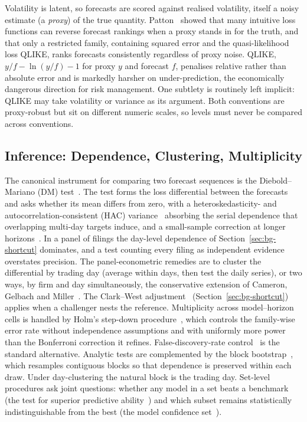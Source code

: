 Volatility is latent, so forecasts are scored against realised volatility, itself a noisy estimate (a \emph{proxy}) of the true quantity. Patton~\cite{patton2011proxies} showed that many intuitive loss functions can reverse forecast rankings when a proxy stands in for the truth, and that only a restricted family, containing squared error and the quasi-likelihood loss QLIKE, ranks forecasts consistently regardless of proxy noise. QLIKE, $y/f - \ln(y/f) - 1$ for proxy $y$ and forecast $f$, penalises relative rather than absolute error and is markedly harsher on under-prediction, the economically dangerous direction for risk management. One subtlety is routinely left implicit: QLIKE may take volatility or variance as its argument. Both conventions are proxy-robust but sit on different numeric scales, so levels must never be compared across conventions.

\subsection{Inference: Dependence, Clustering, Multiplicity}
\label{sec:bg-methods-inference}

The canonical instrument for comparing two forecast sequences is the Diebold--Mariano (DM) test~\cite{diebold1995comparing}. The test forms the loss differential between the forecasts and asks whether its mean differs from zero, with a heteroskedasticity- and autocorrelation-consistent (HAC) variance~\cite{neweywest1987} absorbing the serial dependence that overlapping multi-day targets induce, and a small-sample correction at longer horizons~\cite{harvey1997testing}. In a panel of filings the day-level dependence of Section~\ref{sec:bg-shortcut} dominates, and a test counting every filing as independent evidence overstates precision. The panel-econometric remedies are to cluster the differential by trading day (average within days, then test the daily series), or two ways, by firm and day simultaneously, the conservative extension of Cameron, Gelbach and Miller~\cite{cameron2011twoway}. The Clark--West adjustment~\cite{clarkwest2007} (Section~\ref{sec:bg-shortcut}) applies when a challenger nests the reference. Multiplicity across model--horizon cells is handled by Holm's step-down procedure~\cite{holm1979simple}, which controls the family-wise error rate without independence assumptions and with uniformly more power than the Bonferroni correction it refines. False-discovery-rate control~\cite{benjamini1995controlling} is the standard alternative. Analytic tests are complemented by the block bootstrap~\cite{politis1994stationary}, which resamples contiguous blocks so that dependence is preserved within each draw. Under day-clustering the natural block is the trading day. Set-level procedures ask joint questions: whether any model in a set beats a benchmark (the test for superior predictive ability~\cite{hansen2005spa}) and which subset remains statistically indistinguishable from the best (the model confidence set~\cite{hansen2011mcs}).

